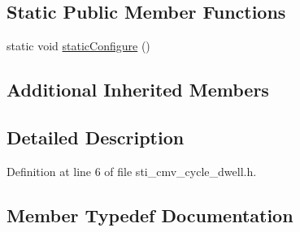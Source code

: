 \subsection*{Static Public Member Functions}
\begin{DoxyCompactItemize}
\item 
static void \hyperlink{structsm__respira__1_1_1cmv__cycle__inner__states_1_1StiPSCycleDwell_affbf6e274207cc248d0ad59d0177172c}{static\+Configure} ()
\end{DoxyCompactItemize}
\subsection*{Additional Inherited Members}


\subsection{Detailed Description}


Definition at line 6 of file sti\+\_\+cmv\+\_\+cycle\+\_\+dwell.\+h.



\subsection{Member Typedef Documentation}
\mbox{\label{structsm__respira__1_1_1cmv__cycle__inner__states_1_1StiPSCycleDwell_a393e74db3d401609684a11fb37bd23ce}} 
